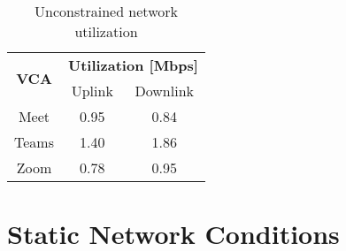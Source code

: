 \begin{table}[]
\centering
\begin{tabular}{|c|c|c|}
\hline
\multirow{2}{*}{\textbf{VCA}} & \multicolumn{2}{c|}{\textbf{Utilization {[}Mbps{]}}} \\ \cline{2-3} 
                              & Uplink                   & Downlink                  \\ \hline
Meet                          & 0.95                     & 0.84                      \\ \hline
Teams                         & 1.40                      & 1.86                      \\ \hline
Zoom                          & 0.78                     & 0.95                      \\ \hline
\end{tabular}
\caption{Unconstrained network utilization}
\label{tab:vca_static}
\end{table}

\section{Static Network Conditions}\label{sec:static}

